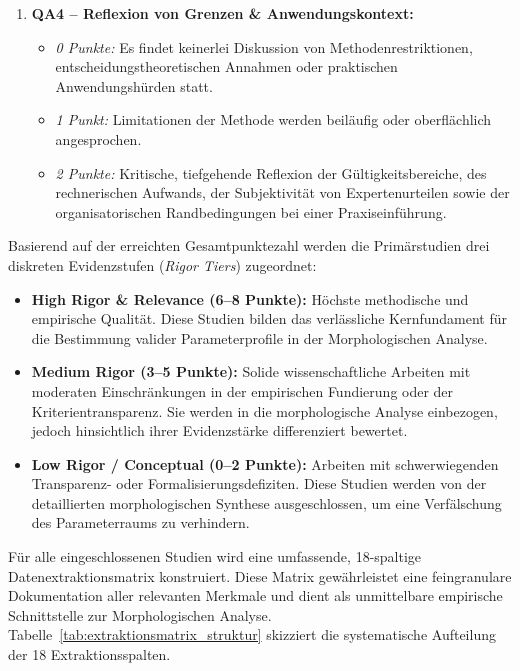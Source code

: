 \begin{enumerate}
\begin{itemize}
    \end{itemize}
    \item \textbf{QA4 -- Reflexion von Grenzen \& Anwendungskontext:} 
    \begin{itemize}
        \item \textit{0 Punkte:} Es findet keinerlei Diskussion von Methodenrestriktionen, entscheidungstheoretischen Annahmen oder praktischen Anwendungshürden statt.
        \item \textit{1 Punkt:} Limitationen der Methode werden beiläufig oder oberflächlich angesprochen.
        \item \textit{2 Punkte:} Kritische, tiefgehende Reflexion der Gültigkeitsbereiche, des rechnerischen Aufwands, der Subjektivität von Expertenurteilen sowie der organisatorischen Randbedingungen bei einer Praxiseinführung.
    \end{itemize}
\end{enumerate}

Basierend auf der erreichten Gesamtpunktezahl werden die Primärstudien drei diskreten Evidenzstufen (\textit{Rigor Tiers}) zugeordnet:
\begin{itemize}
    \item \textbf{High Rigor \& Relevance (6--8 Punkte):} Höchste methodische und empirische Qualität. Diese Studien bilden das verlässliche Kernfundament für die Bestimmung valider Parameterprofile in der Morphologischen Analyse.
    \item \textbf{Medium Rigor (3--5 Punkte):} Solide wissenschaftliche Arbeiten mit moderaten Einschränkungen in der empirischen Fundierung oder der Kriterientransparenz. Sie werden in die morphologische Analyse einbezogen, jedoch hinsichtlich ihrer Evidenzstärke differenziert bewertet.
    \item \textbf{Low Rigor / Conceptual (0--2 Punkte):} Arbeiten mit schwerwiegenden Transparenz- oder Formalisierungsdefiziten. Diese Studien werden von der detaillierten morphologischen Synthese ausgeschlossen, um eine Verfälschung des Parameterraums zu verhindern.
\end{itemize}

Für alle eingeschlossenen Studien wird eine umfassende, 18-spaltige Datenextraktionsmatrix konstruiert. Diese Matrix gewährleistet eine feingranulare Dokumentation aller relevanten Merkmale und dient als unmittelbare empirische Schnittstelle zur Morphologischen Analyse. Tabelle~\ref{tab:extraktionsmatrix_struktur} skizziert die systematische Aufteilung der 18 Extraktionsspalten.

